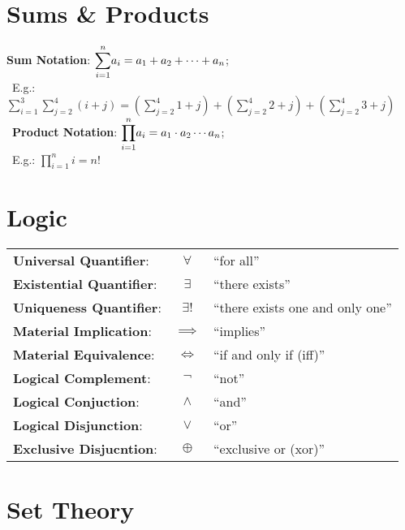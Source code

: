 \documentclass[a4paper, 12pt]{report}
\theoremstyle{definition}
\begin{document}
\begin{doublespace}

\section{Sums \& Products}
\label{sec:sum_and_product}

\textbf{Sum Notation}: \(\mathlarger{\sum}\limits_{i=1}^n a_i
= a_1 + a_2 + \dots + a_n\);\\
\
\indent E.g.: \(\sum\limits_{i=1}^3 \sum\limits_{j=2}^4 (i + j)
= (\sum\limits_{j=2}^4 1+j) + (\sum\limits_{j=2}^4 2+j)
+ (\sum\limits_{j=2}^4 3+j)\)\\
\
\textbf{Product Notation}: \(\mathlarger{\prod}\limits_{i=1}^n a_i
= a_1 \cdot a_2 \cdots a_n\);\\
\
\indent E.g.: \(\prod\limits_{i=1}^n i = n!\)

\section{Logic}
\label{sec:logic}

\begin{tabular}{lcl}
\textbf{Universal Quantifier}: & \(\forall\) & ``for all''\\

\textbf{Existential Quantifier}: & \(\exists\) & ``there exists''\\

\textbf{Uniqueness Quantifier}: & \(\exists!\) & ``there exists one and only
one''\\

\textbf{Material Implication}: & \(\implies\) & ``implies''\\

\textbf{Material Equivalence}: & \(\iff \) & ``if and only if (iff)''\\

\textbf{Logical Complement}: & \(\lnot\) & ``not''\\

\textbf{Logical Conjuction}: & \(\land\) & ``and''\\

\textbf{Logical Disjunction}: & \(\lor\) & ``or''\\

\textbf{Exclusive Disjucntion}: & \(\oplus\) & ``exclusive or (xor)''
\end{tabular}

\pagebreak

\section{Set Theory}
\label{sec:set_theory}


\end{doublespace}
\end{document}
